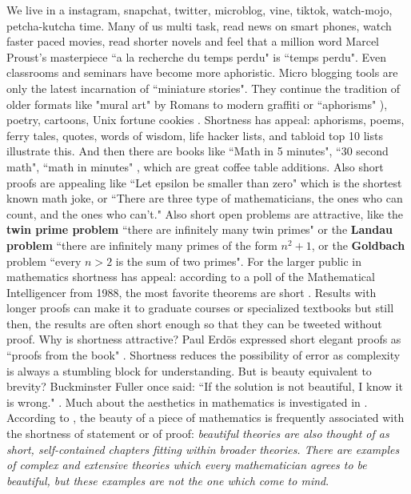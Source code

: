 \documentclass[12pt]{amsart}
\newcounter{example}    \def\example#1{ \item \fontsize{12}{15} \selectfont #1 \fontsize{12}{15} \selectfont }
\begin{document}
We live in a instagram, snapchat, twitter, microblog, vine, tiktok, watch-mojo,
petcha-kutcha time. Many of us multi task, read news on
smart phones, watch faster paced movies, read shorter novels and feel that a million word
Marcel Proust's masterpiece ``a la recherche du temps perdu" is ``temps perdu". Even
classrooms and seminars have become more aphoristic.
Micro blogging tools are only the latest incarnation of ``miniature stories".
They continue the tradition of older formats like "mural art" by Romans
to modern graffiti or ``aphorisms" 
\cite{KrantzApocrypha1,KrantzApocrypha2}),
poetry, cartoons, Unix fortune cookies \cite{KenArnold}.
Shortness has appeal: aphorisms, poems, ferry tales,
quotes, words of wisdom, life hacker lists, and tabloid top 10 lists
illustrate this. And then there are books like ``Math in 5 minutes", ``30 second math",
``math in minutes" \cite{BehrendsFuenfMinutenMath,MathInMinutes,30SecondMath},
which are great coffee table additions. Also short proofs are appealing like ``Let epsilon be smaller than zero"
which is the shortest known math joke, or ``There are three type of mathematicians,
the ones who can count, and the ones who can't." Also short open problems are attractive, like
the {\bf twin prime problem} ``there are infinitely many twin primes" or 
the {\bf Landau problem} ``there are infinitely many primes of the form $n^2+1$, or the {\bf Goldbach} problem
``every $n>2$ is the sum of two primes". 
For the larger public in mathematics shortness has appeal:
according to a poll of the Mathematical Intelligencer from 1988, the most favorite theorems
are short \cite{Wells1,Wells2}. Results with longer proofs can make it
to graduate courses or specialized textbooks but still then, the results are often
short enough so that they can be tweeted without proof.
Why is shortness attractive? Paul Erd\"os expressed short elegant proofs as ``proofs from the book" 
\cite{AigZie}.  Shortness reduces the possibility of error as complexity is always a stumbling block
for understanding. But is beauty equivalent to brevity?
Buckminster Fuller once said: ``If the solution is not beautiful, I know it is wrong."
\cite{AharoniBeauty}. Much about the aesthetics in mathematics is investigated
in \cite{MontanoExplainingBeauty}.
According to \cite{RotaBeauty}, the beauty of a piece of mathematics is frequently
associated with the shortness of statement or of proof:
{\it beautiful theories are also thought of as short, self-contained chapters fitting
within broader theories. There are examples of complex and extensive theories which
every mathematician agrees to be beautiful, but these examples are not the one
which come to mind}.
\end{document}
